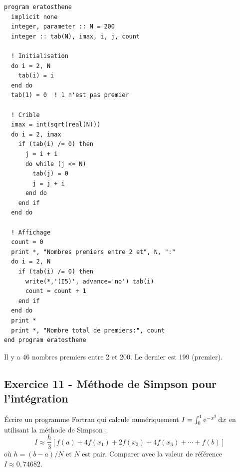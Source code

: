 \documentclass[12pt,a4paper]{article}
\begin{document}
\begin{boitecorrige}
\begin{lstlisting}
program eratosthene
  implicit none
  integer, parameter :: N = 200
  integer :: tab(N), imax, i, j, count

  ! Initialisation
  do i = 2, N
    tab(i) = i
  end do
  tab(1) = 0  ! 1 n'est pas premier

  ! Crible
  imax = int(sqrt(real(N)))
  do i = 2, imax
    if (tab(i) /= 0) then
      j = i + i
      do while (j <= N)
        tab(j) = 0
        j = j + i
      end do
    end if
  end do

  ! Affichage
  count = 0
  print *, "Nombres premiers entre 2 et", N, ":"
  do i = 2, N
    if (tab(i) /= 0) then
      write(*,'(I5)', advance='no') tab(i)
      count = count + 1
    end if
  end do
  print *
  print *, "Nombre total de premiers:", count
end program eratosthene
\end{lstlisting}

Il y a 46 nombres premiers entre 2 et 200. Le dernier est 199 (premier).
\end{boitecorrige}

\subsection*{Exercice 11 - Méthode de Simpson pour l'intégration \niveau{\difficile}}

\begin{boiteexercice}
Écrire un programme Fortran qui calcule numériquement $I = \int_0^1 \mathrm{e}^{-x^2}\,\mathrm{d} x$ en utilisant la méthode de Simpson :
\[
I \approx \frac{h}{3}\left[f(a) + 4f(x_1) + 2f(x_2) + 4f(x_3) + \cdots + f(b)\right]
\]
où $h = (b-a)/N$ et $N$ est pair. Comparer avec la valeur de référence $I \approx 0{,}74682$.
\end{boiteexercice}
\end{document}
